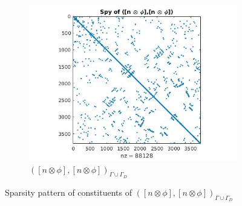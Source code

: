 \documentclass[a4paper,twoside,openright]{book}
\begin{document}
\begin{figure}
\begin{subfigure}{\textwidth}
  \includegraphics[width=\textwidth]{figure2.jpg}
  \caption{$([n \otimes \phi],[n \otimes \phi])_{\Gamma \cup \Gamma_D}$}
  \label{fig:figure2}
\end{subfigure}
\caption{Sparsity pattern of constituents of $([n \otimes \phi],[n \otimes \phi])_{\Gamma \cup \Gamma_D}$}
\label{figure_2_all}
\end{figure}
\end{document}

